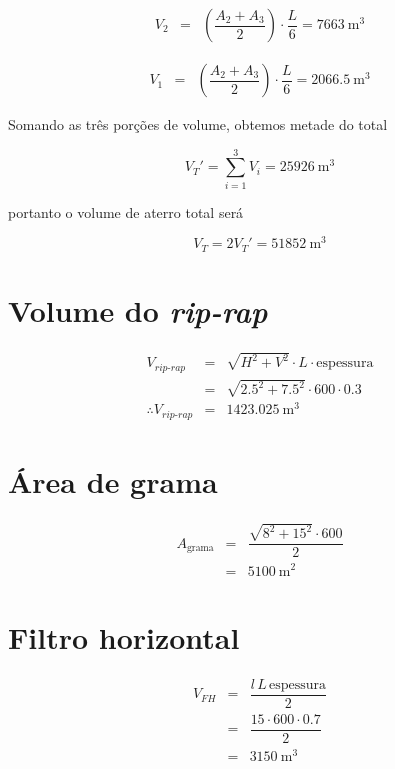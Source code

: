 \documentclass[a4paper, 12pt, brazilian]{article}
\begin{document}
	\begin{eqnarray}
		V_{2}&=&\left(\dfrac{A_{2}+A_{3}}{2}\right)\cdot\dfrac{L}{6}=\SI{7663}{\meter^{3}}	
	\end{eqnarray}
	
	\begin{eqnarray}
		V_{1}&=&\left(\dfrac{A_{2}+A_{3}}{2}\right)\cdot\dfrac{L}{6}=\SI{2066.5}{\meter^{3}}
	\end{eqnarray}
	
	Somando as três porções de volume, obtemos metade do total
	
	\begin{equation}
		V_{T}'=\sum\limits_{i=1}^{3}V_{i}=\SI{25926}{\meter^{3}}
	\end{equation}
	
	portanto o volume de aterro total será 
	
	\begin{equation}
		V_{T}=2V_{T}'=\SI{51852}{\meter^{3}}
	\end{equation}
	
	\section{Volume do \textit{rip-rap}}
	\begin{eqnarray}
		V_{\textit{rip-rap}}&=&\sqrt{H^{2}+V^{2}}\cdot L\cdot\textrm{espessura}\\
		&=&\sqrt{2.5^{2}+7.5^{2}}\cdot 600\cdot 0.3\\
		\therefore V_{\textit{rip-rap}}&=&\SI{1423.025}{\meter^{3}}
	\end{eqnarray}
	
	\section{Área de grama}
	\begin{eqnarray}
		A_{\textrm{grama}}&=&\dfrac{\sqrt{8^{2}+15^{2}}\cdot 600}{2}\\
		&=&\SI{5100}{\meter^{2}}
	\end{eqnarray}
	
	\section{Filtro horizontal}
	\begin{eqnarray}
		V_{FH}&=&\dfrac{l\,L\,\textrm{espessura}}{2}\\
		&=&\dfrac{15\cdot 600\cdot 0.7}{2}\\
		&=&\SI{3150}{\meter^{3}}
	\end{eqnarray}
	
\end{document}
